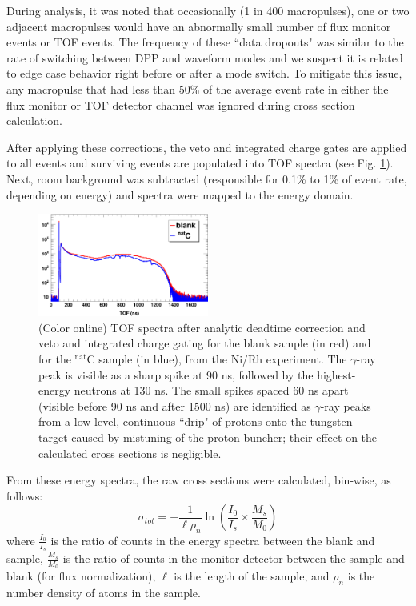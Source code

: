 \documentclass[twocolumn,secnumarabic,amssymb, nobibnotes, aps, prl,
superscriptaddress, nobalancelastpage]{revtex4}
\newcommand{\tot}{\ensuremath{\sigma_{tot}}}
\begin{document}
During analysis, it was noted that occasionally (1 in 400 macropulses), one or two 
adjacent macropulses would have an abnormally small number of flux monitor events or 
TOF events. The frequency of these ``data dropouts" was similar to the rate of
switching between DPP and waveform modes and we suspect it is related to edge
case behavior right before or after a mode switch. To mitigate this issue,
any macropulse that had less than 50\% of the average event rate in either the
flux monitor or TOF detector channel was ignored during cross section calculation.

After applying these corrections, the veto and integrated charge gates are applied to 
all events and surviving events are populated into TOF spectra (see Fig.
\ref{ExampleTOFSpectrum}). Next, room background was subtracted (responsible for 0.1\% to 
1\% of event rate, depending on energy) and spectra were mapped to the energy domain.

\begin{figure}
    \includegraphics[width=0.5\textwidth]{figures/exampleTOFSpectrum.png}
    \caption{(Color online) TOF spectra after analytic deadtime correction and
        veto and integrated charge gating for the blank sample (in
        red) and for the $^{\text{nat}}$C sample (in blue), from the Ni/Rh experiment.
        The $\gamma$-ray peak is visible as a sharp spike at 90 ns, followed by
        the highest-energy neutrons at 130 ns. The small spikes spaced 60 ns
        apart (visible before 90 ns and after 1500
        ns) are identified as $\gamma$-ray peaks from a low-level, continuous ``drip" 
        of protons onto the tungsten target caused by mistuning of the proton 
        buncher; their effect on the calculated cross sections is negligible.
    }
    \label{ExampleTOFSpectrum}
\end{figure}

From these energy spectra, the raw cross sections were calculated, bin-wise, as follows:
$$
\tot = -\frac{1}{\ell\rho_{n}}
\ln \left(\frac{I_{0}}{I_{s}}\times\frac{M_{s}}{M_{0}}\right)
$$
where $\frac{I_{0}}{I_{s}}$ is the ratio of counts in the energy spectra between 
the blank and sample, $\frac{M_{s}}{M_{0}}$ is the ratio of counts in the
monitor detector between the sample and blank (for flux normalization), $\ell$ is the length 
of the sample, and $\rho_{n}$ is the number density of atoms in the sample.
\end{document}

